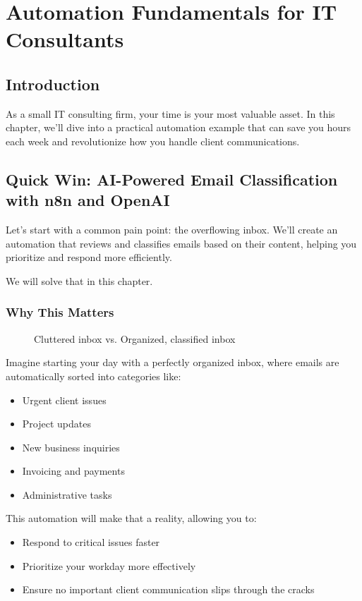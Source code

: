 \chapter{Automation Fundamentals for IT Consultants}


\section{Introduction}

As a small IT consulting firm, your time is your most valuable asset. In this chapter, we'll dive into a practical automation example that can save you hours each week and revolutionize how you handle client communications.


\section{Quick Win: AI-Powered Email Classification with n8n and OpenAI}

Let's start with a common pain point: the overflowing inbox. We'll create an automation that reviews and classifies emails based on their content, helping you prioritize and respond more efficiently.

We will solve that in this chapter.

\subsection{Why This Matters}

\begin{figure}[h]
    \caption{Cluttered inbox vs. Organized, classified inbox}
\end{figure}

Imagine starting your day with a perfectly organized inbox, where emails are automatically sorted into categories like:

\begin{itemize}
    \item Urgent client issues
    \item Project updates
    \item New business inquiries
    \item Invoicing and payments
    \item Administrative tasks
\end{itemize}

This automation will make that a reality, allowing you to:
\begin{itemize}
    \item Respond to critical issues faster
    \item Prioritize your workday more effectively
    \item Ensure no important client communication slips through the cracks
\end{itemize}

